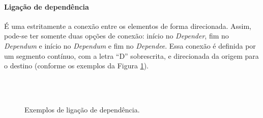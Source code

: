             \paragraph{Ligação de dependência}
                É uma estritamente a conexão entre os elementos de forma direcionada.
                Assim, pode-se ter somente duas opções de conexão: início no \emph{Depender}, fim no \emph{Dependum} e início no \emph{Dependum} e fim no \emph{Dependee}. Essa conexão é definida por um segmento contínuo, com a letra ``D'' sobrescrita, e direcionada da origem para o destino (conforme os exemplos da Figura \ref{fig:dependency}).
                \begin{figure}[h!]
                    \centering
                        \\
                        ~
                        \caption{Exemplos de ligação de dependência.}
                        \label{fig:dependency}
                \end{figure}
                
